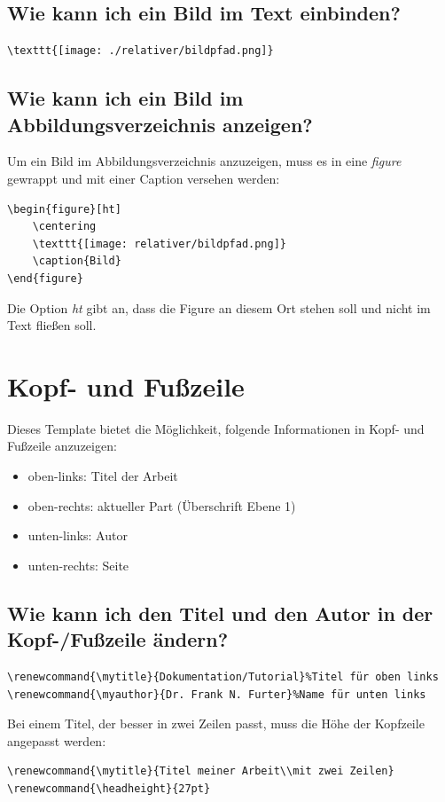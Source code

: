 \documentclass[12pt]{article}
\begin{document}
\subsection{Wie kann ich ein Bild im Text einbinden?}
\begin{verbatim}
\texttt{[image: ./relativer/bildpfad.png]}
\end{verbatim}

\subsection{Wie kann ich ein Bild im Abbildungsverzeichnis anzeigen?}
Um ein Bild im Abbildungsverzeichnis anzuzeigen, muss es in eine \textit{figure} gewrappt und mit einer Caption versehen werden:
\begin{verbatim}
\begin{figure}[ht]
    \centering
    \texttt{[image: relativer/bildpfad.png]}
    \caption{Bild}
\end{figure}
\end{verbatim}
\noindent Die Option \textit{ht} gibt an, dass die Figure an diesem Ort stehen soll und nicht im Text fließen soll.

\section{Kopf- und Fußzeile}
Dieses Template bietet die Möglichkeit, folgende Informationen in Kopf- und Fußzeile anzuzeigen:
\begin{itemize}
\item oben-links: Titel der Arbeit
\item oben-rechts: aktueller Part (Überschrift Ebene 1)
\item unten-links: Autor
\item unten-rechts: Seite
\end{itemize}

\subsection{Wie kann ich den Titel und den Autor in der Kopf-/Fußzeile ändern?}
\begin{verbatim}
\renewcommand{\mytitle}{Dokumentation/Tutorial}%Titel für oben links
\renewcommand{\myauthor}{Dr. Frank N. Furter}%Name für unten links
\end{verbatim}
Bei einem Titel, der besser in zwei Zeilen passt, muss die Höhe der Kopfzeile angepasst werden:
\begin{verbatim}
\renewcommand{\mytitle}{Titel meiner Arbeit\\mit zwei Zeilen}
\renewcommand{\headheight}{27pt}
\end{verbatim}
\end{document}
